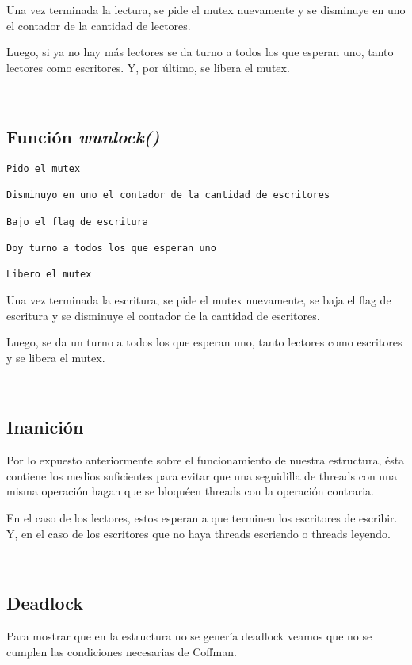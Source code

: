 Una vez terminada la lectura, se pide el mutex nuevamente y se disminuye en uno el contador de la cantidad de lectores.

Luego, si ya no hay más lectores se da turno a todos los que esperan uno, tanto lectores como escritores. Y, por último, se libera el mutex.

~
\subsection{Función \textit{wunlock()}}

\begin{lstlisting}
Pido el mutex

Disminuyo en uno el contador de la cantidad de escritores

Bajo el flag de escritura

Doy turno a todos los que esperan uno

Libero el mutex
\end{lstlisting}

Una vez terminada la escritura, se pide el mutex nuevamente, se baja el flag de escritura y se disminuye el contador de la cantidad de escritores.

Luego, se da un turno a todos los que esperan uno, tanto lectores como escritores y se libera el mutex.


~
\subsection{Inanición}

Por lo expuesto anteriormente sobre el funcionamiento de nuestra estructura, ésta contiene los medios suficientes para evitar que una seguidilla de threads con una misma operación hagan que se bloquéen threads con la operación contraria.

En el caso de los lectores, estos esperan a que terminen los escritores de escribir. Y, en el caso de los escritores que no haya threads escriendo o threads leyendo.

~
\subsection{Deadlock}

Para mostrar que en la estructura no se genería deadlock veamos que no se cumplen las condiciones necesarias de Coffman.

